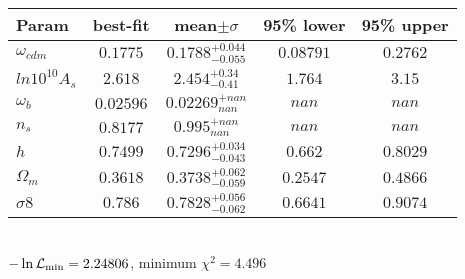 \begin{tabular}{|l|c|c|c|c|} 
 \hline 
Param & best-fit & mean$\pm\sigma$ & 95\% lower & 95\% upper \\ \hline 
$\omega_{cdm }$ &$0.1775$ & $0.1788_{-0.055}^{+0.044}$ & $0.08791$ & $0.2762$ \\ 
$ln10^{10}A_{s }$ &$2.618$ & $2.454_{-0.41}^{+0.34}$ & $1.764$ & $3.15$ \\ 
$\omega_{b }$ &$0.02596$ & $0.02269_{nan}^{+nan}$ & $nan$ & $nan$ \\ 
$n_{s }$ &$0.8177$ & $0.995_{nan}^{+nan}$ & $nan$ & $nan$ \\ 
$h$ &$0.7499$ & $0.7296_{-0.043}^{+0.034}$ & $0.662$ & $0.8029$ \\ 
$\Omega_{m }$ &$0.3618$ & $0.3738_{-0.059}^{+0.062}$ & $0.2547$ & $0.4866$ \\ 
$\sigma8$ &$0.786$ & $0.7828_{-0.062}^{+0.056}$ & $0.6641$ & $0.9074$ \\ 
\hline 
 \end{tabular} \\ 
$-\ln{\cal L}_\mathrm{min} =2.24806$, minimum $\chi^2=4.496$ \\ 
